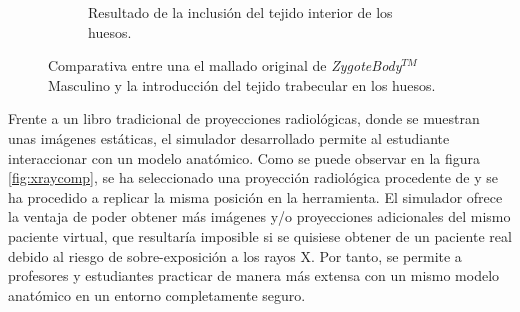 \begin{figure}[ht]
\begin{subfigure}[b]{0.45\linewidth}
        \caption{Resultado de la inclusión del tejido interior de los huesos.}
    \end{subfigure}
    \caption{\label{fig:bonecompare} Comparativa entre una el mallado original de \emph{ZygoteBody}$^{TM}$ Masculino y la introducción del tejido trabecular en los huesos.}
   \end{figure}


Frente a un libro tradicional de proyecciones radiológicas, donde se muestran unas imágenes estáticas, 
el simulador desarrollado permite al estudiante interaccionar con un modelo anatómico.
Como se puede observar en la figura \ref{fig:xraycomp}, se ha seleccionado una proyección radiológica procedente de \cite{carver2012medical} y se ha procedido a replicar la misma posición en la herramienta. El simulador ofrece la ventaja de poder obtener más imágenes y/o proyecciones adicionales del mismo paciente virtual, que resultaría imposible si se quisiese obtener de un paciente real debido al riesgo de sobre-exposición a los rayos X. Por tanto, se  permite a profesores y estudiantes practicar de manera más extensa con un mismo modelo anatómico en un entorno completamente seguro.




